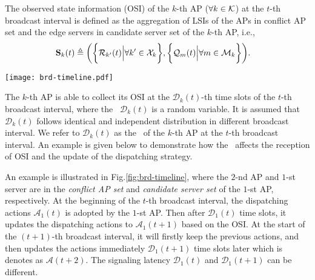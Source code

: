 \begin{definition}
    The observed state information (OSI) of the $k$-th AP ($\forall k\in\mathcal{K}$) at the $t$-th broadcast interval is defined as the aggregation of LSIs of the APs in {conflict AP set} and the edge servers in {candidate server set} of the $k$-th AP, i.e.,
    \begin{align}
        \mathbf{S}_{k}(t) &\triangleq
        \bigg(
            \bigg\{\mathcal{R}_{k'}(t) \Big| \forall k'\in\mathcal{X}_{k}\bigg\},
            \bigg\{\mathcal{Q}_{m}(t) \Big| \forall m\in\mathcal{M}_{k}\bigg\}
        \bigg).
    \end{align}
    \label{def:OSI}
\end{definition}

\begin{figure*}[t]
    \centering
    \texttt{[image: brd-timeline.pdf]}
    \caption{The timeline illustration of reception of OSI for the $1$-st AP where $2$-nd AP is in its \emph{conflict AP set} and $1$-st server is in its \emph{candidate server set}.}
    \label{fig:brd-timeline}
\end{figure*}

The $k$-th AP is able to collect its OSI at the $\mathcal{D}_{k}(t)$-th time slots of the $t$-th broadcast interval, where the \brlatency~$\mathcal{D}_{k}(t)$ is a random variable.
It is assumed that $\mathcal{D}_{k}(t)$ follows identical and independent distribution in different broadcast interval.
We refer to $\mathcal{D}_{k}(t)$ as the \brlatency~of the $k$-th AP at the $t$-th broadcast interval.
An example is given below to demonstrate how the \brlatency~affects the reception of OSI and the update of the dispatching strategy.

\begin{example}
    An example is illustrated in Fig.\ref{fig:brd-timeline}, where the $2$-nd AP and $1$-st server are in the \emph{conflict AP set} and \emph{candidate server set} of the $1$-st AP, respectively.
    At the beginning of the $t$-th broadcast interval, the dispatching actions $\mathcal{A}_{1}(t)$ is adopted by the $1$-st AP.
    Then after $\mathcal{D}_{1}(t)$ time slots, it updates the dispatching actions to $\mathcal{A}_{1}(t+1)$ based on the OSI.
    At the start of the $(t+1)$-th broadcast interval, it will firstly keep the previous actions, and then updates the actions immediately $\mathcal{D}_{1}(t+1)$ time slots later which is denotes as $\mathcal{A}(t+2)$.
    The signaling latency $\mathcal{D}_1(t)$ and $\mathcal{D}_1(t+1)$ can be different.
\end{example}

